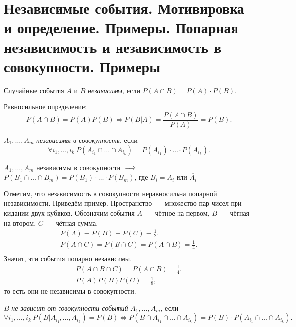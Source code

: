 \section{Независимые события. Мотивировка и определение. Примеры. Попарная независимость и независимость в совокупности. Примеры}

\begin{definition}
    Случайные события $A$ и $B$ \textit{независимы}, если $P(A \cap B) = P(A)\cdot P(B)$.
\end{definition}
Равносильное определение:
$$P(A \cap B) = P(A) P(B) \iff P(B|A) = \frac{P(A\cap B)}{P(A)} = P(B).$$
\begin{definition}
    $A_1, \ldots, A_m$ \textit{независимы в совокупности}, если
    $$\forall{i_1, \ldots, i_k}\ P(A_{i_1}\cap\ldots\cap A_{i_k})=P(A_{i_1})\cdot\ldots\cdot P(A_{i_k}).$$
\end{definition}

\begin{lemma}\label{ex:nez}
    $A_1, \ldots , A_m$ независимы в совокупности $\implies$
    $P(B_1\cap\ldots \cap B_m)=P(B_1)\cdot\ldots \cdot P(B_m)$, где $B_i = A_i$ или $\overline{A_i}$
\end{lemma}



Отметим, что независимость в совокупности неравносильна попарной независимости.
Приведём пример. Пространство~--- множество пар чисел при кидании двух кубиков.
Обозначим события $A$~--- чётное на первом, $B$~--- чётная на втором, $C$~--- чётная сумма.
\begin{gather*}
P(A) = P(B) = P(C) = \frac{1}{2}.\\
P(A\cap C) = P(B \cap C) = P(A \cap B) = \frac{1}{4}.\\
\end{gather*}
Значит, эти события попарно независимы. 
\begin{gather*}
P(A \cap B \cap C) = P(A \cap B) = \frac{1}{4}.\\
P(A)P(B)P(C) = \frac{1}{8},
\end{gather*}
то есть они не независимы в совокупности. 

\begin{definition}
    $B$ \textit{не зависит от совокупности событий} $A_1, \ldots, A_m$, если
    $$\forall{i_1, \ldots, i_k}\ P(B|A_{i_1},\ldots, A_{i_k})=P(B) \iff P(B \cap A_{i_1} \cap \ldots \cap A_{i_k}) = P(B)\cdot P(A_{i_1} \cap \ldots \cap A_{i_k}).$$
\end{definition}

